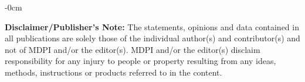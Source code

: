 \documentclass[journal,article,submit,pdftex,moreauthors]{Definitions/mdpi}
\begin{document}


\begin{adjustwidth}{-\extralength}{0cm}





\vspace{20pt} 

\noindent \textbf{Disclaimer/Publisher's Note:} The statements, opinions and data contained in all publications are solely those of the individual author(s) and contributor(s) and not of MDPI and/or the editor(s). MDPI and/or the editor(s) disclaim responsibility for any injury to people or property resulting from any ideas, methods, instructions or products referred to in the content.


\end{adjustwidth}




\end{document}
